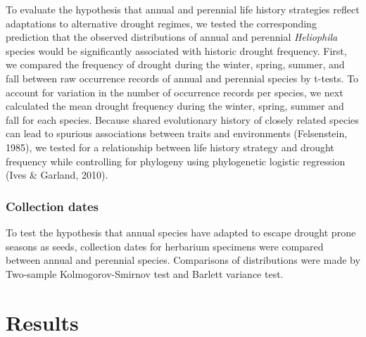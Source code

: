 \documentclass[man,floatsintext]{apa6}
\theoremstyle{definition}
\theoremstyle{definition}
\theoremstyle{definition}
\theoremstyle{remark}
\begin{document}
To evaluate the hypothesis that annual and perennial life history
strategies reflect adaptations to alternative drought regimes, we tested
the corresponding prediction that the observed distributions of annual
and perennial \emph{Heliophila} species would be significantly
associated with historic drought frequency. First, we compared the
frequency of drought during the winter, spring, summer, and fall between
raw occurrence records of annual and perennial species by t-tests. To
account for variation in the number of occurrence records per species,
we next calculated the mean drought frequency during the winter, spring,
summer and fall for each species. Because shared evolutionary history of
closely related species can lead to spurious associations between traits
and environments (Felsenstein, 1985), we tested for a relationship
between life history strategy and drought frequency while controlling
for phylogeny using phylogenetic logistic regression (Ives \& Garland,
2010).

\hypertarget{collection-dates}{%
\subsubsection{Collection dates}\label{collection-dates}}

To test the hypothesis that annual species have adapted to escape
drought prone seasons as seeds, collection dates for herbarium specimens
were compared between annual and perennial species. Comparisons of
distributions were made by Two-sample Kolmogorov-Smirnov test and
Barlett variance test.

\hypertarget{results}{%
\section{Results}\label{results}}
\end{document}
